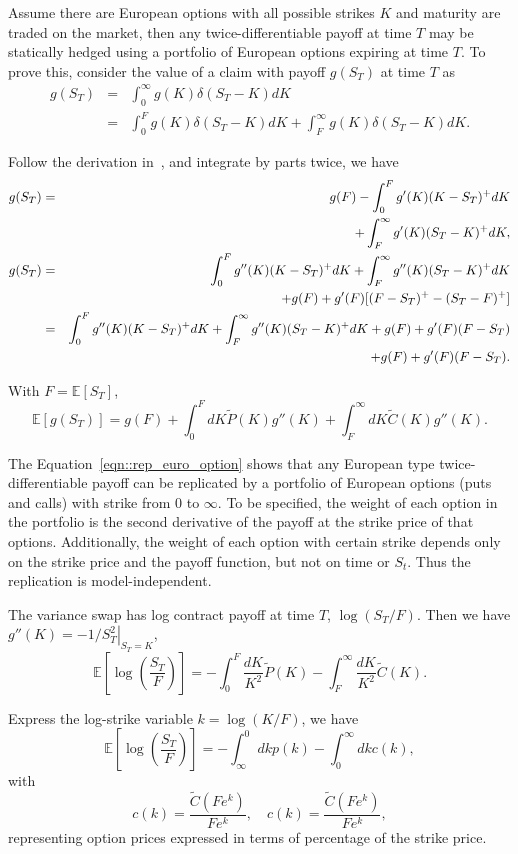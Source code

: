 \documentclass[11pt,reqno,final]{amsart}
\begin{document}
Assume there are European options with all possible strikes $K$ and maturity are traded on the market, then any twice-differentiable payoff at time $T$ may be statically hedged using a portfolio of European options expiring at time $T$. To prove this, consider the value of a claim with payoff $g(S_T)$ at time $T$ as
\begin{eqnarray*}
g(S_T) &=& \int_0^{\infty} g(K)\delta(S_T-K)dK \\
       &=& \int_0^{F} g(K)\delta(S_T-K)dK + \int_F^{\infty} g(K)\delta(S_T-K)dK.
\end{eqnarray*}

Follow the derivation in~\cite{CM98}, and integrate by parts twice, we have
\begin{eqnarray}
g(S_T) &=& g(F) - \int_0^{F} g'(K)(K-S_T)^{+}dK \notag \\
       & & + \int_F^{\infty} g'(K)(S_T-K)^{+} dK, \notag \\
g(S_T) &=& \int_0^{F} g''(K)(K-S_T)^{+}dK + \int_F^{\infty} g''(K)(S_T-K)^{+} dK \notag \\
       & & + g(F) + g'(F)[(F-S_T)^{+} - (S_T-F)^{+}] \notag \\
       &=& \int_0^{F} g''(K)(K-S_T)^{+}dK + \int_F^{\infty} g''(K)(S_T-K)^{+} dK + g(F) + g'(F)(F-S_T) \notag \\
       & & +g(F) +g'(F)(F-S_T). \label{eqn::rep_euro_option}
\end{eqnarray}

With $F=\mathbb{E}[S_T]$,
$$
\mathbb{E}[g(S_T)] = g(F)+\int_0^{F}dK \tilde{P}(K)g''(K) + \int_{F}^{\infty} dK \tilde{C} (K) g''(K).
$$

The Equation~\ref{eqn::rep_euro_option} shows that any European type twice-differentiable payoff can be replicated by a portfolio of European options (puts and calls) with strike from 0 to $\infty$. To be specified, the weight of each option in the portfolio is the second derivative of the payoff at the strike price of that options. Additionally, the weight of each option with certain strike depends only on the strike price and the payoff function, but not on time or $S_t$. Thus the replication is model-independent.

The variance swap has log contract payoff at time $T$, $\log(S_T/F)$. Then we have $g''(K) \left. =-1/S_T^2 \right|_{S_T=K}$,
$$
\mathbb{E}\left[ \log\left(\frac{S_T}{F}\right)\right] = -\int_0^F \frac{dK}{K^2} \tilde{P}(K) - \int_F^{\infty} \frac{dK}{K^2} \tilde{C}(K).
$$

Express the log-strike variable $k=\log(K/F)$, we have
\begin{equation}
\mathbb{E}\left[ \log\left(\frac{S_T}{F}\right)\right] = -\int_{\infty}^0 dk p(k) - \int_0^{\infty} dk c(k), \label{eqn::log_option}
\end{equation}
with
$$
c(k) = \frac{\tilde{C}(Fe^k)}{Fe^k}, \quad c(k) = \frac{\tilde{C}(Fe^k)}{Fe^k},
$$
representing option prices expressed in terms of percentage of the strike price.
\end{document}

